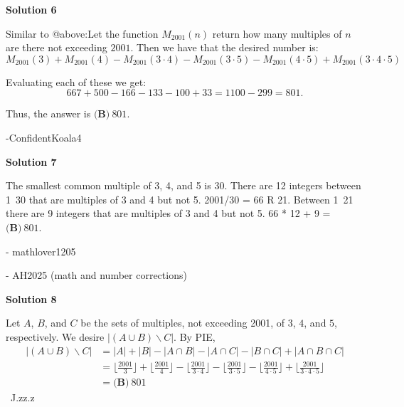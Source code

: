 \begin{enumerate}
 



\textbf{Solution 6}

Similar to @above:Let the function $M_{2001}(n)$ return how many multiples of $n$ are there not exceeding $2001$. Then we have that the desired number is:
 \[M_{2001}(3)+M_{2001}(4)-M_{2001}(3\cdot 4)-M_{2001}(3 \cdot 5) - M_{2001}(4 \cdot 5)+M_{2001}(3 \cdot 4 \cdot 5)\]

 Evaluating each of these we get:
 \[667+500-166-133-100+33 = 1100-299 = 801.\]

 Thus, the answer is $\boxed{\textbf{(B)}\ 801}.$

 -ConfidentKoala4

 


 



\textbf{Solution 7}

The smallest common multiple of 3, 4, and 5 is 30. There are 12 integers between 1~30 that are multiples of 3 and 4 but not 5. 2001/30 = 66 R 21. Between 1~21 there are 9 integers that are multiples of 3 and 4 but not 5. 66 * 12 + 9 = $\boxed{\textbf{(B)}\ 801}.$

 - mathlover1205

 - AH2025 (math and number corrections)

 



\textbf{Solution 8}

Let $A$, $B$, and $C$ be the sets of multiples, not exceeding 2001, of $3$, $4$, and $5$, respectively. We desire $|(A\cup B)\backslash C|$. By PIE,\begin{align*}|(A\cup B)\backslash C| &= |A| + |B| - |A \cap B| - |A \cap C| - |B \cap C| + |A \cap B \cap C| \\ &= \lfloor \frac{2001}{3} \rfloor + \lfloor \frac{2001}{4} \rfloor - \lfloor \frac{2001}{3\cdot 4} \rfloor - \lfloor \frac{2001}{3\cdot 5} \rfloor - \lfloor \frac{2001}{4\cdot 5} \rfloor + \lfloor \frac{2001}{3\cdot 4\cdot 5} \rfloor \\&= \boxed{\textbf{(B)}\ 801}\end{align*}
~J.zz.z

 


\end{enumerate}